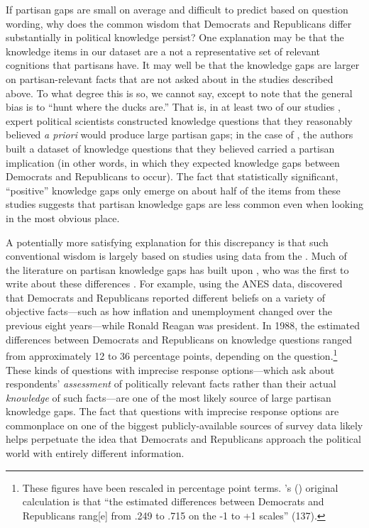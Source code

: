 \documentclass[12pt, letterpaper]{article}
\def\citeapos#1{\citeauthor{#1}'s (\citeyear{#1})}
\begin{document}
If partisan gaps are small on average and difficult to predict based on question wording, why does the common wisdom that Democrats and Republicans differ substantially in political knowledge persist? One explanation may be that the knowledge items in our dataset are a not a representative set of relevant cognitions that partisans have. It may well be that the knowledge gaps are larger on partisan-relevant facts that are not asked about in the studies described above. To what degree this is so, we cannot say, except to note that the general bias is to ``hunt where the ducks are.'' That is, in at least two of our studies \citep{bullocketal_2015, prior2015you}, expert political scientists constructed knowledge questions that they reasonably believed \textit{a priori} would produce large partisan gaps; in the case of \citet{jerit2012partisan}, the authors built a dataset of knowledge questions that they believed carried a partisan implication (in other words, in which they expected knowledge gaps between Democrats and Republicans to occur). The fact that statistically significant, ``positive'' knowledge gaps only emerge on about half of the items from these studies suggests that partisan knowledge gaps are less common even when looking in the most obvious place. 

A potentially more satisfying explanation for this discrepancy is that such conventional wisdom is largely based on studies using data from the \citet{anes_gen}. Much of the literature on partisan knowledge gaps has built upon \citet{bartels_2002}, who was the first to write about these differences \citep{bullocklenz_2019}. For example, using the ANES data, \citet{bartels_2002} discovered that Democrats and Republicans reported different beliefs on a variety of objective facts---such as how inflation and unemployment changed over the previous eight years---while Ronald Reagan was president. In 1988, the estimated differences between Democrats and Republicans on knowledge questions ranged from approximately 12 to 36 percentage points, depending on the question.\footnote{These figures have been rescaled in percentage point terms. \citeapos{bartels_2002}  original calculation is that ``the estimated differences between Democrats and Republicans rang[e] from .249 to .715 on the -1 to +1 scales'' (137).} These kinds of questions with imprecise response options---which ask about respondents' \textit{assessment} of politically relevant facts rather than their actual \textit{knowledge} of such facts---are one of the most likely source of large partisan knowledge gaps. The fact that questions with imprecise response options are commonplace on one of the biggest publicly-available sources of survey data likely helps perpetuate the idea that Democrats and Republicans approach the political world with entirely different information. 
\end{document}
